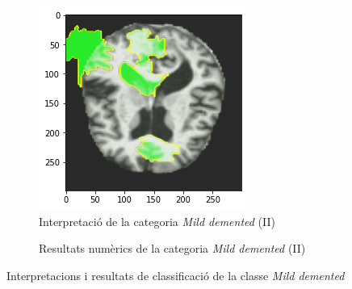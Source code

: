\documentclass[a4paper,12pt]{report}
\begin{document}
\begin{figure}[h!]
\begin{subfigure}[b]{0.40\linewidth}
    \end{subfigure}
    \begin{subfigure}[b]{0.40\linewidth}
        \includegraphics[width=\linewidth]{images/Mild 2.png}
        \caption{Interpretació de la categoria \textit{Mild demented} (II)}
        \label{fig:MD2}
    \end{subfigure}
    \begin{subfigure}[b]{0.40\linewidth}
        \caption{Resultats numèrics de la categoria \textit{Mild demented} (II)}
        \label{fig:ClassificacioMD1}
    \end{subfigure}
    \caption{Interpretacions i resultats de classificació de la classe \textit{Mild demented}}
    \label{fig:MDInterpretacions}
\end{figure}
\newpage
\end{document}
